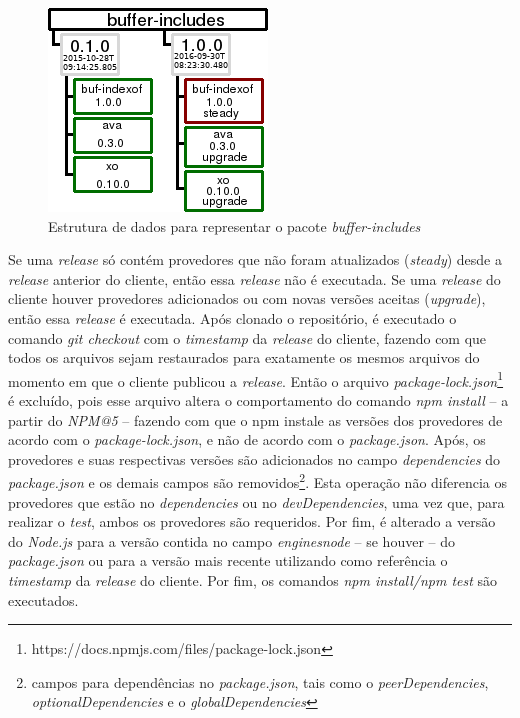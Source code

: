 \begin{figure}
    \centering
    \includegraphics[scale=2]{figuras/bcdetect_work.png}
    \caption{Estrutura de dados para representar o pacote \textit{buffer-includes}}
    \label{fig:bc_work}
\end{figure}{}

Se uma \textit{release} só contém provedores que não foram atualizados (\textit{steady}) desde a \textit{release} anterior do cliente, então essa \textit{release} não é executada. Se uma \textit{release} do cliente houver provedores adicionados ou com novas versões aceitas (\textit{upgrade}), então essa \textit{release} é executada. Após clonado o repositório, é executado o comando \textit{git checkout} com o \textit{timestamp} da \textit{release} do cliente, fazendo com que todos os arquivos sejam restaurados para exatamente os mesmos arquivos do momento em que o cliente publicou a \textit{release}. Então o arquivo \textit{package-lock.json}\footnote{https://docs.npmjs.com/files/package-lock.json} é excluído, pois esse arquivo altera o comportamento do comando \textit{npm install} -- a partir do \textit{NPM@5} -- fazendo com que o \gls{npm} instale as versões dos provedores de acordo com o \textit{package-lock.json}, e não de acordo com o \textit{package.json}. Após, os provedores e suas respectivas versões são adicionados no campo \textit{dependencies} do \textit{package.json} e os demais campos são removidos\footnote{campos para dependências no \textit{package.json}, tais como o \textit{peerDependencies}, \textit{optionalDependencies} e o \textit{globalDependencies}}. Esta operação não diferencia os provedores que estão no \textit{dependencies} ou no \textit{devDependencies}, uma vez que, para realizar o \textit{test}, ambos os provedores são requeridos. Por fim, é alterado a versão do \textit{Node.js} para a versão contida no campo \textit{engines\textrightarrow node} -- se houver -- do \textit{package.json} ou para a versão mais recente utilizando como referência o \textit{timestamp} da \textit{release} do cliente. Por fim, os comandos \textit{npm install/npm test} são executados.

